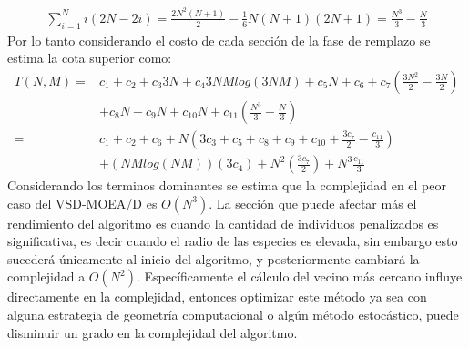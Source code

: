 \begin{equation}
\begin{split}
\sum_{i=1}^N i(2N-2i) = \frac{2N^2(N+1)}{2} - \frac{1}{6} N(N+1)(2N+1) = \frac{N^3}{3} - \frac{N}{3}
\end{split}
\end{equation}
Por lo tanto considerando el costo de cada sección de la fase de remplazo se estima la cota superior como:
\begin{equation}
\begin{split}
T(N, M) =&
      c_1 + c_2 + c_3 3N + c_4 3NM log(3NM)+ c_5 N + c_6 +  c_7  \left ( \frac{3N^2}{2} - \frac{3N}{2} \right ) \\ 
	&+  c_8 N + c_9 N + c_{10} N + c_{11} \left ( \frac{N^3}{3} - \frac{N}{3} \right ) \\
=&  c_1 + c_2 + c_6 + N \left ( 3 c_3 + c_5 + c_8 + c_9 + c_{10} + \frac{3 c_7}{2} - \frac{c_{11}}{3} \right ) \\
	&+ (NM log(NM))(3 c_ 4) + N^2(\frac{3 c_7}{2}) + N^3 \frac{c_{11}}{3}
\end{split}
\end{equation}
Considerando los terminos dominantes se estima que la complejidad en el peor caso del VSD-MOEA/D es $O(N^3)$.
%
La sección que puede afectar más el rendimiento del algoritmo es cuando la cantidad de individuos penalizados es significativa, es decir cuando el radio de las especies es elevada, sin embargo esto sucederá únicamente al inicio del algoritmo, y posteriormente cambiará la complejidad a $O(N^2)$.
%
Específicamente el cálculo del vecino más cercano influye directamente en la complejidad, entonces optimizar este método ya sea con alguna estrategia de geometría computacional o algún método estocástico, puede disminuir un grado en la complejidad del algoritmo.

